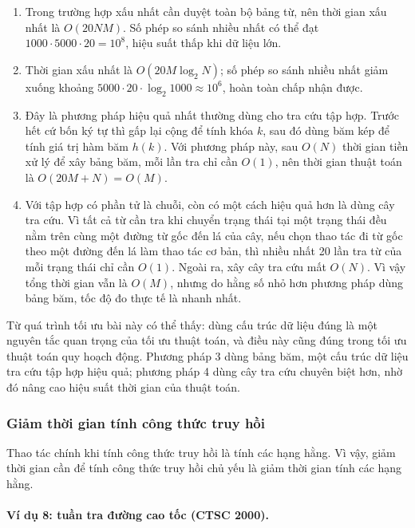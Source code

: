 \documentclass[11pt]{article}
\begin{document}
\begin{enumerate}
  \item {} Trong trường hợp xấu nhất cần duyệt toàn bộ bảng
  từ, nên thời gian xấu nhất là \(O(20NM)\). Số phép so sánh nhiều nhất có
  thể đạt \(1000\cdot 5000\cdot 20=10^8\), hiệu suất thấp khi dữ liệu lớn.
  \item {} Thời gian xấu nhất là \(O(20M\log_2 N)\); số
  phép so sánh nhiều nhất giảm xuống khoảng \(5000\cdot20\cdot\log_2 1000
  \approx 10^6\), hoàn toàn chấp nhận được.
  \item {} Đây là phương pháp hiệu quả nhất thường dùng cho
  tra cứu tập hợp. Trước hết cứ bốn ký tự thì gấp lại cộng để tính khóa
  \(k\), sau đó dùng băm kép để tính giá trị hàm băm \(h(k)\). Với phương
  pháp này, sau \(O(N)\) thời gian tiền xử lý để xây bảng băm, mỗi lần tra
  chỉ cần \(O(1)\), nên thời gian thuật toán là \(O(20M+N)=O(M)\).
  \item {} Với tập hợp có phần tử là chuỗi, còn có một cách
  hiệu quả hơn là dùng cây tra cứu. Vì tất cả từ cần tra khi chuyển trạng
  thái tại một trạng thái đều nằm trên cùng một đường từ gốc đến lá của cây,
  nếu chọn thao tác đi từ gốc theo một đường đến lá làm thao tác cơ bản, thì
  nhiều nhất 20 lần tra từ của mỗi trạng thái chỉ cần \(O(1)\). Ngoài ra,
  xây cây tra cứu mất \(O(N)\). Vì vậy tổng thời gian vẫn là \(O(M)\), nhưng
  do hằng số nhỏ hơn phương pháp dùng bảng băm, tốc độ đo thực tế là nhanh
  nhất.
\end{enumerate}

Từ quá trình tối ưu bài này có thể thấy: dùng cấu trúc dữ liệu đúng là một
nguyên tắc quan trọng của tối ưu thuật toán, và điều này cũng đúng trong tối
ưu thuật toán quy hoạch động. Phương pháp 3 dùng bảng băm, một cấu trúc dữ
liệu tra cứu tập hợp hiệu quả; phương pháp 4 dùng cây tra cứu chuyên biệt
hơn, nhờ đó nâng cao hiệu suất thời gian của thuật toán.

\subsubsection{Giảm thời gian tính công thức truy hồi}

Thao tác chính khi tính công thức truy hồi là tính các hạng hằng. Vì vậy,
giảm thời gian cần để tính công thức truy hồi chủ yếu là giảm thời gian tính
các hạng hằng.

\paragraph{Ví dụ 8: tuần tra đường cao tốc (CTSC 2000).}
\end{document}
